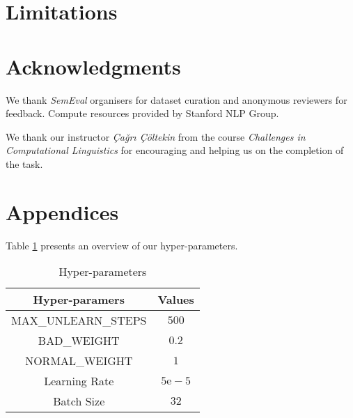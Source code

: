 \documentclass[11pt]{article}
\begin{document}
\section*{Limitations}

\section*{Acknowledgments}
We thank \textit{SemEval} organisers for dataset curation and anonymous reviewers for feedback. Compute resources provided by Stanford NLP Group.

We thank our instructor \textit{Çağrı Çöltekin} from the course \textit{Challenges in Computational Linguistics} for encouraging and helping us on the completion of the task.






\appendix

\section{Appendices}

Table \ref{tab:hyper} presents an overview of our hyper-parameters.

\begin{table}[h]
    \centering
    \begin{tabular}{c|c}
        \hline
        \textbf{Hyper-paramers} & \textbf{Values} \\
        \hline
        MAX\_UNLEARN\_STEPS & $500$ \\
        BAD\_WEIGHT & $0.2$ \\
        NORMAL\_WEIGHT & $1$ \\
        Learning Rate & $5\mathrm{e}-5$ \\
        Batch Size & $32$ \\
        \hline
    \end{tabular}
    \caption{Hyper-parameters}
    \label{tab:hyper}
\end{table}

\label{sec:appendix}
\end{document}
